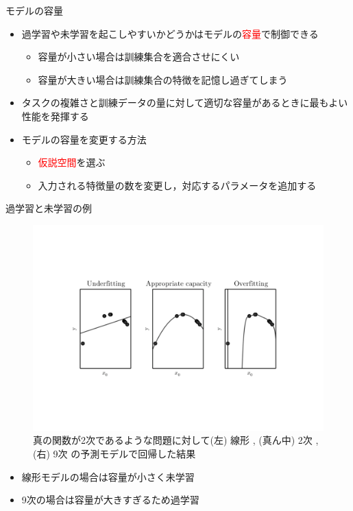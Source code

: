 \documentclass[dvipdfmx, 10pt]{beamer}
\begin{document}
\begin{frame}{モデルの容量}
  \begin{itemize}
    \item 過学習や未学習を起こしやすいかどうかはモデルの\textcolor{red}{容量}で制御できる
    \begin{itemize}
      \item 容量が小さい場合は訓練集合を適合させにくい
      \item 容量が大きい場合は訓練集合の特徴を記憶し過ぎてしまう
    \end{itemize}
    \item タスクの複雑さと訓練データの量に対して適切な容量があるときに最もよい性能を発揮する

    \item モデルの容量を変更する方法
    \begin{itemize}
      \item \textcolor{red}{仮説空間}を選ぶ
      \item 入力される特徴量の数を変更し，対応するパラメータを追加する
    \end{itemize}
  \end{itemize}
\end{frame}


\begin{frame}{過学習と未学習の例}
  \begin{figure}[htbp]
     \includegraphics[keepaspectratio, scale=0.4, angle=-90]{./images/over-under-fitting.pdf}
     \caption{真の関数が2次であるような問題に対して(左) 線形 , (真ん中) 2次 , (右) 9次 の予測モデルで回帰した結果}
  \end{figure}
  \begin{itemize}
    \item 線形モデルの場合は容量が小さく未学習
    \item 9次の場合は容量が大きすぎるため過学習
  \end{itemize}
\end{frame}
\end{document}
